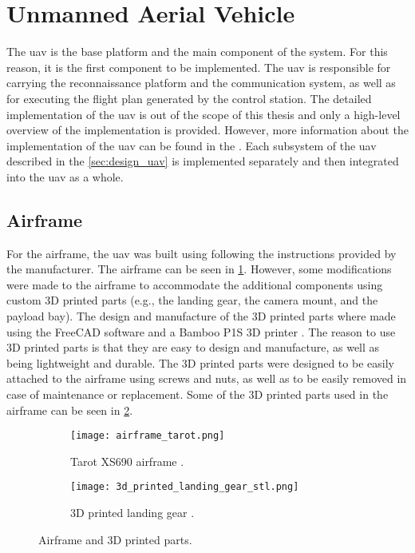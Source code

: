 \section{Unmanned Aerial Vehicle}\label{sec:implementation_uav}

The \gls{uav} is the base platform and the main component of the system. For this reason, it is the first component to be implemented. The \gls{uav} is responsible for carrying the reconnaissance platform and the communication system, as well as for executing the flight plan generated by the control station. The detailed implementation of the \gls{uav} is out of the scope of this thesis and only a high-level overview of the implementation is provided. However, more information about the implementation of the \gls{uav} can be found in the \autocite{developingcosteffectivedrones5g}. Each subsystem of the \gls{uav} described in the \cref{sec:design_uav}
is implemented separately and then integrated into the \gls{uav} as a whole.

\subsection{Airframe}\label{subsec:implementation_airframe}

For the airframe, the \gls{uav} was built using following the instructions provided by the manufacturer. The airframe can be seen in \cref{fig:airframe}. However, some modifications were made to the airframe to accommodate the additional components using custom 3D printed parts (e.g., the landing gear, the camera mount, and the payload bay). The design and manufacture of the 3D printed parts where made using the FreeCAD software \autocite{freecadFreeCADYour} and a Bamboo P1S 3D printer \autocite{bambulabBambuPrinter}. The reason to use 3D printed parts is that they are easy to design and manufacture, as well as being lightweight and durable. The 3D printed parts were designed to be easily attached to the airframe using screws and nuts, as well as to be easily removed in case of maintenance or replacement. Some of the 3D printed parts used in the airframe can be seen in \cref{fig:3d_printed_landing_gear_stl}.

\begin{figure}
  \begin{subfigure}{0.4\textwidth}
    \texttt{[image: airframe\_tarot.png]}
    \caption{Tarot XS690 airframe \autocite{developingcosteffectivedrones5g}.}\label{fig:airframe}
  \end{subfigure}
  \hfill
  \begin{subfigure}{0.4\textwidth}
    \texttt{[image: 3d\_printed\_landing\_gear\_stl.png]}
    \caption{3D printed landing gear \autocite{developingcosteffectivedrones5g}.}\label{fig:3d_printed_landing_gear_stl}
  \end{subfigure}

  \caption{Airframe and 3D printed parts.}\label{fig:airframe_and_3d_printed_parts}
\end{figure}

